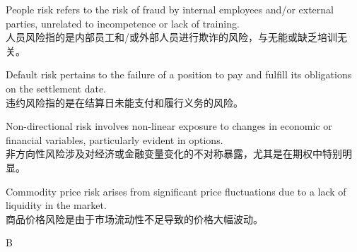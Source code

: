 \documentclass{article}
\begin{document}
  
    \begin{choices}
        \item People risk refers to the risk of fraud by internal employees and/or external parties, unrelated to incompetence or lack of training. \\
        人员风险指的是内部员工和/或外部人员进行欺诈的风险，与无能或缺乏培训无关。
        
        \item Default risk pertains to the failure of a position to pay and fulfill its obligations on the settlement date. \\
        违约风险指的是在结算日未能支付和履行义务的风险。
        
        \item Non-directional risk involves non-linear exposure to changes in economic or financial variables, particularly evident in options. \\
        非方向性风险涉及对经济或金融变量变化的不对称暴露，尤其是在期权中特别明显。
        
        \item Commodity price risk arises from significant price fluctuations due to a lack of liquidity in the market. \\
        商品价格风险是由于市场流动性不足导致的价格大幅波动。
    \end{choices}


\begin{correctanswer}
   B
\end{correctanswer}
\end{document}
